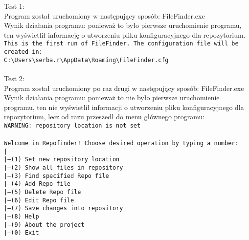 \documentclass[10pt, a4paper]{article}
\begin{document}
Test 1:\\
Program został uruchomiony w następujący sposób: FileFinder.exe\\
Wynik działania programu: ponieważ to było pierwsze uruchomienie programu, ten wyświetlił informację o utworzeniu pliku konfiguracyjnego dla repozytorium.\\
\texttt{This is the first run of FileFinder. The configuration file will be created in:\\
C:\textbackslash Users\textbackslash serba.r\textbackslash AppData\textbackslash Roaming\textbackslash FileFinder.cfg}\\
\\
Test 2:\\
Program został uruchomiony po raz drugi w następujący sposób: FileFinder.exe\\
Wynik działania programu: ponieważ to nie było pierwsze uruchomienie programu, ten nie wyświetlił informacji o utworzeniu pliku konfiguracyjnego dla repozytorium, lecz od razu przeszedł do menu głównego programu:\\
\texttt{WARNING: repository location is not set\\
\\
Welcome in Repofinder! Choose desired operation by typing a number:\\
|\\
|---(1) Set new repository location\\
|---(2) Show all files in repository\\
|---(3) Find specified Repo file\\
|---(4) Add Repo file\\
|---(5) Delete Repo file\\
|---(6) Edit Repo file\\
|---(7) Save changes into repository\\
|---(8) Help\\
|---(9) About the project\\
|---(0) Exit}\\
\\
\end{document}
